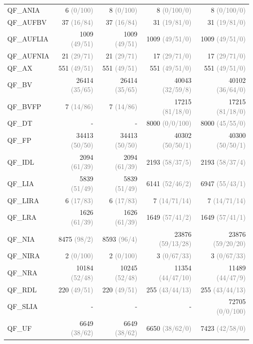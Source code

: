 \documentclass[dvipsnames,table,twoside,11pt]{article}
\newcommand{\gray}[1]{\textcolor{gray}{#1}}
\begin{document}
\begin{table}
{\begin{tabular}{lrrrr}
    QF\_ANIA & 6 \gray{(0/100)} & 8 \gray{(0/100)} & 8 \gray{(0/100/0)} & 8 \gray{(0/100/0)}\\
    QF\_AUFBV & 37 \gray{(16/84)} & 37 \gray{(16/84)} & 31 \gray{(19/81/0)} & 31 \gray{(19/81/0)}\\
    QF\_AUFLIA & 1009 \gray{(49/51)} & 1009 \gray{(49/51)} & 1009 \gray{(49/51/0)} & 1009 \gray{(49/51/0)}\\
    QF\_AUFNIA & 21 \gray{(29/71)} & 21 \gray{(29/71)} & 17 \gray{(29/71/0)} & 17 \gray{(29/71/0)}\\
    QF\_AX & 551 \gray{(49/51)} & 551 \gray{(49/51)} & 551 \gray{(49/51/0)} & 551 \gray{(49/51/0)}\\
    QF\_BV & 26414 \gray{(35/65)} & 26414 \gray{(35/65)} & 40043 \gray{(32/59/8)} & 40102 \gray{(36/64/0)}\\
    QF\_BVFP & 7 \gray{(14/86)} & 7 \gray{(14/86)} & 17215 \gray{(81/18/0)} & 17215 \gray{(81/18/0)}\\
    QF\_DT & - & - & 8000 \gray{(0/0/100)} & 8000 \gray{(45/55/0)}\\
    QF\_FP & 34413 \gray{(50/50)} & 34413 \gray{(50/50)} & 40302 \gray{(50/50/1)} & 40300 \gray{(50/50/1)}\\
    QF\_IDL & 2094 \gray{(61/39)} & 2094 \gray{(61/39)} & 2193 \gray{(58/37/5)} & 2193 \gray{(58/37/4)}\\
    QF\_LIA & 5839 \gray{(51/49)} & 5839 \gray{(51/49)} & 6141 \gray{(52/46/2)} & 6947 \gray{(55/43/1)}\\
    QF\_LIRA & 6 \gray{(17/83)} & 6 \gray{(17/83)} & 7 \gray{(14/71/14)} & 7 \gray{(14/71/14)}\\
    QF\_LRA & 1626 \gray{(61/39)} & 1626 \gray{(61/39)} & 1649 \gray{(57/41/2)} & 1649 \gray{(57/41/1)}\\
    QF\_NIA & 8475 \gray{(98/2)} & 8593 \gray{(96/4)} & 23876 \gray{(59/13/28)} & 23876 \gray{(59/20/20)}\\
    QF\_NIRA & 2 \gray{(0/100)} & 2 \gray{(0/100)} & 3 \gray{(0/67/33)} & 3 \gray{(0/67/33)}\\
    QF\_NRA & 10184 \gray{(52/48)} & 10245 \gray{(52/48)} & 11354 \gray{(44/47/10)} & 11489 \gray{(44/47/9)}\\
    QF\_RDL & 220 \gray{(49/51)} & 220 \gray{(49/51)} & 255 \gray{(43/44/13)} & 255 \gray{(43/44/13)}\\
    QF\_SLIA & - & - & - & 72705 \gray{(0/0/100)}\\
    QF\_UF & 6649 \gray{(38/62)} & 6649 \gray{(38/62)} & 6650 \gray{(38/62/0)} & 7423 \gray{(42/58/0)}\\

\end{tabular}}
\end{table}
\end{document}
